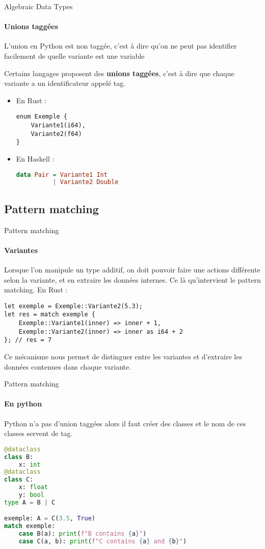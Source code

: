 \documentclass[aspectratio=169]{beamer}
\begin{document}
\begin{frame}[fragile]{Algebraic Data Types}
    \framesubtitle{Unions taggées}
    L'union en Python est non taggée, c'est à dire qu'on ne peut pas identifier facilement de quelle variante est une variable

    Certains langages proposent des \textbf{unions taggées}, c'est à dire que chaque variante a un identificateur appelé tag.

    \begin{itemize}
    \item En Rust :
    \begin{lstlisting}
enum Exemple {
    Variante1(i64),
    Variante2(f64)
}
    \end{lstlisting}

    \item En Haskell :
    \begin{lstlisting}[language=Haskell]
data Pair = Variante1 Int 
          | Variante2 Double
    \end{lstlisting}
    \end{itemize}
\end{frame}

\subsection{Pattern matching}

\begin{frame}[fragile]{Pattern matching}
    \framesubtitle{Variantes}
    Lorsque l'on manipule un type additif, on doit pouvoir faire une actions différente selon la variante, et en extraire les données internes. Ce là qu'intervient le pattern matching.
    En Rust :
    \begin{lstlisting}
let exemple = Exemple::Variante2(5.3);
let res = match exemple {
    Exemple::Variante1(inner) => inner + 1,
    Exemple::Variante2(inner) => inner as i64 + 2
}; // res = 7
    \end{lstlisting}
    Ce mécanisme nous permet de distinguer entre les variantes et d'extraire les données contenues dans chaque variante.
\end{frame}

\begin{frame}[fragile]{Pattern matching}
    \framesubtitle{En python}
    Python n'a pas d'union taggées alors il faut créer des classes et le nom de ces classes servent de tag.
    \begin{lstlisting}[language=Python]
@dataclass
class B: 
    x: int
@dataclass
class C:
    x: float
    y: bool
type A = B | C

exemple: A = C(3.5, True)
match exemple:
    case B(a): print(f"B contains {a}")
    case C(a, b): print(f"C contains {a} and {b}") 
    \end{lstlisting}
\end{frame}
\end{document}
